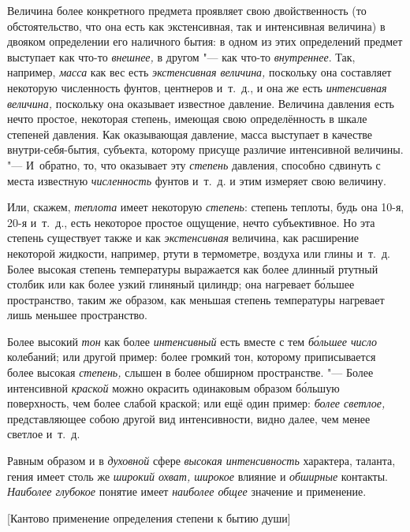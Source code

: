 Величина более конкретного предмета проявляет свою двойственность (то
обстоятельство, что она есть как экстенсивная, так и интенсивная величина)
в двояком определении его наличного бытия: в одном из этих определений
предмет выступает как что-то {\em внешнее,} в другом "--- как что-то
{\em внутреннее}. Так, например, {\em масса} как вес есть {\em экстенсивная
величина,} поскольку она составляет некоторую численность фунтов, центнеров
и~т.~д., и она же есть {\em интенсивная величина,} поскольку она оказывает
известное давление. Величина давления есть нечто простое, некоторая степень,
имеющая свою определённость в шкале степеней давления. Как оказывающая
давление, масса выступает в качестве внутри-себя-бытия, субъекта, которому
присуще различие интенсивной величины. "--- И~обратно, то, что оказывает эту
{\em степень} давления, способно сдвинуть с места известную {\em численность}
фунтов и~т.~д. и этим измеряет свою величину.

Или, скажем, {\em теплота} имеет некоторую {\em степень}: степень теплоты, будь
она 10-я, 20-я и~т.~д., есть некоторое простое ощущение, нечто субъективное. Но
эта степень существует также и как {\em экстенсивная} величина, как расширение
некоторой жидкости, например, ртути в термометре, воздуха или глины и~т.~д.
Более высокая степень температуры выражается как более длинный ртутный столбик
или как более узкий глиняный цилиндр; она нагревает б\'{о}льшее пространство,
таким же образом, как меньшая степень температуры нагревает лишь меньшее
пространство.

Более высокий {\em тон} как более {\em интенсивный} есть вместе с тем
{\em б\'{о}льшее число} колебаний; или другой пример: более громкий тон,
которому приписывается более высокая {\em степень,} слышен в более обширном
пространстве. "--- Более интенсивной {\em краской} можно окрасить одинаковым
образом б\'{о}льшую поверхность, чем более слабой краской; или ещё один пример:
{\em более светлое,} представляющее собою другой вид интенсивности, видно
далее, чем менее светлое и~т.~д.

Равным образом и в {\em духовной} сфере {\em высокая интенсивность} характера,
таланта, гения имеет столь же {\em широкий охват, широкое}
влияние и {\em обширные} контакты.
{\em Наиболее глубокое} понятие имеет {\em наиболее общее}
значение и применение.

%
{[Кантово применение определения степени к бытию души]}

